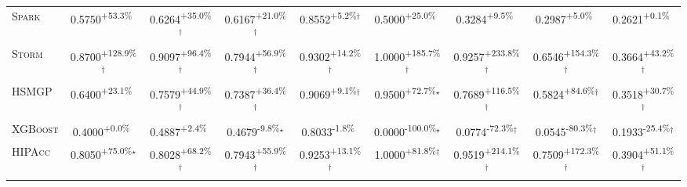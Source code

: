 \begin{table}[htbp]
\begin{tabular}{l|cccc|cccc}
\textsc{Spark} & \cellcolor{green!30}0.5750\textsuperscript{+53.3\%}$^{\,\,\,}$ & \cellcolor{green!30}0.6264\textsuperscript{+35.0\%}$^\dagger$ & \cellcolor{green!30}0.6167\textsuperscript{+21.0\%}$^\dagger$ & \cellcolor{green!30}0.8552\textsuperscript{+5.2\%}$^\dagger$ & \cellcolor{green!30}0.5000\textsuperscript{+25.0\%}$^{\,\,\,}$ & \cellcolor{green!30}0.3284\textsuperscript{+9.5\%}$^{\,\,\,}$ & \cellcolor{green!30}0.2987\textsuperscript{+5.0\%}$^{\,\,\,}$ & \cellcolor{green!30}0.2621\textsuperscript{+0.1\%}$^{\,\,\,}$ \\
\textsc{Storm} & \cellcolor{green!30}0.8700\textsuperscript{+128.9\%}$^\dagger$ & \cellcolor{green!30}0.9097\textsuperscript{+96.4\%}$^\dagger$ & \cellcolor{green!30}0.7944\textsuperscript{+56.9\%}$^\dagger$ & \cellcolor{green!30}0.9302\textsuperscript{+14.2\%}$^\dagger$ & \cellcolor{green!30}1.0000\textsuperscript{+185.7\%}$^\dagger$ & \cellcolor{green!30}0.9257\textsuperscript{+233.8\%}$^\dagger$ & \cellcolor{green!30}0.6546\textsuperscript{+154.3\%}$^\dagger$ & \cellcolor{green!30}0.3664\textsuperscript{+43.2\%}$^\dagger$ \\
\textsc{HSMGP} & \cellcolor{green!30}0.6400\textsuperscript{+23.1\%}$^{\,\,\,}$ & \cellcolor{green!30}0.7579\textsuperscript{+44.9\%}$^\dagger$ & \cellcolor{green!30}0.7387\textsuperscript{+36.4\%}$^\dagger$ & \cellcolor{green!30}0.9069\textsuperscript{+9.1\%}$^\dagger$ & \cellcolor{green!30}0.9500\textsuperscript{+72.7\%}$^\star$ & \cellcolor{green!30}0.7689\textsuperscript{+116.5\%}$^\dagger$ & \cellcolor{green!30}0.5824\textsuperscript{+84.6\%}$^\dagger$ & \cellcolor{green!30}0.3518\textsuperscript{+30.7\%}$^\dagger$ \\
\textsc{XGBoost} & \cellcolor{green!30}0.4000\textsuperscript{+0.0\%}$^{\,\,\,}$ & \cellcolor{green!30}0.4887\textsuperscript{+2.4\%}$^{\,\,\,}$ & \cellcolor{red!30}0.4679\textsuperscript{-9.8\%}$^\star$ & \cellcolor{red!30}0.8033\textsuperscript{-1.8\%}$^{\,\,\,}$ & \cellcolor{red!30}0.0000\textsuperscript{-100.0\%}$^\star$ & \cellcolor{red!30}0.0774\textsuperscript{-72.3\%}$^\dagger$ & \cellcolor{red!30}0.0545\textsuperscript{-80.3\%}$^\dagger$ & \cellcolor{red!30}0.1933\textsuperscript{-25.4\%}$^\dagger$ \\
\textsc{HIPAcc} & \cellcolor{green!30}0.8050\textsuperscript{+75.0\%}$^\star$ & \cellcolor{green!30}0.8028\textsuperscript{+68.2\%}$^\dagger$ & \cellcolor{green!30}0.7943\textsuperscript{+55.9\%}$^\dagger$ & \cellcolor{green!30}0.9253\textsuperscript{+13.1\%}$^\dagger$ & \cellcolor{green!30}1.0000\textsuperscript{+81.8\%}$^\dagger$ & \cellcolor{green!30}0.9519\textsuperscript{+214.1\%}$^\dagger$ & \cellcolor{green!30}0.7509\textsuperscript{+172.3\%}$^\dagger$ & \cellcolor{green!30}0.3904\textsuperscript{+51.1\%}$^\dagger$ \\

\end{tabular}
\end{table}
